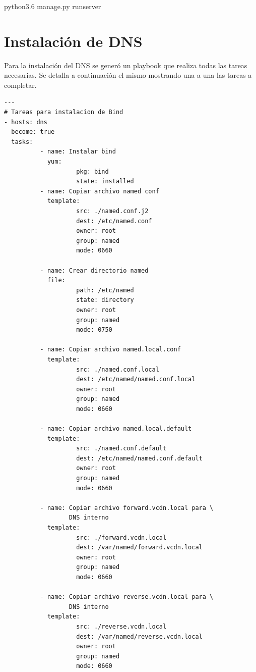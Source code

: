 \documentclass[12pt,a4paper,oneside]{book}
\begin{document}
\vspace{0.5cm}
\begin{frontend}
python3.6 manage.py runserver
\end{frontend}
\vspace{0.5cm}


\section{Instalación de DNS}
\label{seccA.4}
Para la instalación del DNS se generó un playbook que realiza todas las tareas necesarias. Se detalla a continuación el mismo mostrando una a una las tareas a completar.

\begin{lstlisting}[style=codigobase, caption= instalarDNS.yaml]
---
# Tareas para instalacion de Bind
- hosts: dns
  become: true
  tasks:
          - name: Instalar bind
            yum:
                    pkg: bind
                    state: installed
          - name: Copiar archivo named conf
            template:
                    src: ./named.conf.j2
                    dest: /etc/named.conf
                    owner: root
                    group: named
                    mode: 0660

          - name: Crear directorio named
            file:
                    path: /etc/named
                    state: directory
                    owner: root
                    group: named
                    mode: 0750

          - name: Copiar archivo named.local.conf
            template:
                    src: ./named.conf.local
                    dest: /etc/named/named.conf.local
                    owner: root
                    group: named
                    mode: 0660

          - name: Copiar archivo named.local.default
            template:
                    src: ./named.conf.default
                    dest: /etc/named/named.conf.default
                    owner: root
                    group: named
                    mode: 0660

          - name: Copiar archivo forward.vcdn.local para \
                  DNS interno
            template:
                    src: ./forward.vcdn.local
                    dest: /var/named/forward.vcdn.local
                    owner: root
                    group: named
                    mode: 0660

          - name: Copiar archivo reverse.vcdn.local para \
                  DNS interno
            template:
                    src: ./reverse.vcdn.local
                    dest: /var/named/reverse.vcdn.local
                    owner: root
                    group: named
                    mode: 0660
\end{lstlisting}
\end{document}
